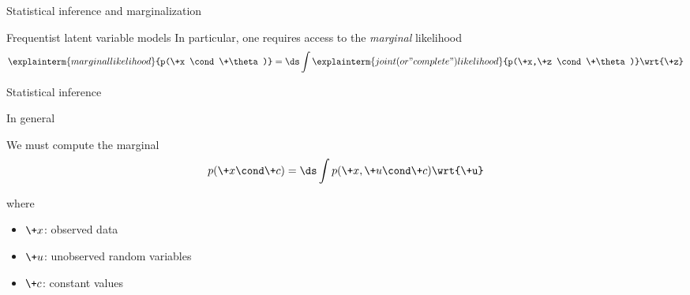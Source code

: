 \documentclass[10pt]{beamer}
\begin{document}
{\begin{frame}{Statistical inference and marginalization}
\begin{block}{Frequentist latent variable models}
	In particular, one requires access to the \textit{marginal} likelihood
	\begin{equation}
	\explainterm{marginal likelihood}{p(\+x \cond \+\theta)} = \ds\int \explainterm{joint (or "complete") likelihood}{p(\+x,\+z \cond \+\theta)} \wrt{\+z} 
	\label{marginal_likelihood}
	\end{equation}
	
	\end{block} 
	
	\end{frame}
	}

\begin{frame}{Statistical inference}


\begin{block}{In general}

We must compute the marginal
\begin{equation}
p(\+x \cond \+c) =  \ds\int p(\+x,\+u \cond \+c) \wrt{\+u}
\end{equation}

where 
\begin{itemize}
\item $\+x$: observed data 
\item $\+u$: unobserved random variables
\item $\+c$: constant values %
\end{itemize}

\end{block}

\end{frame}
\end{document}
